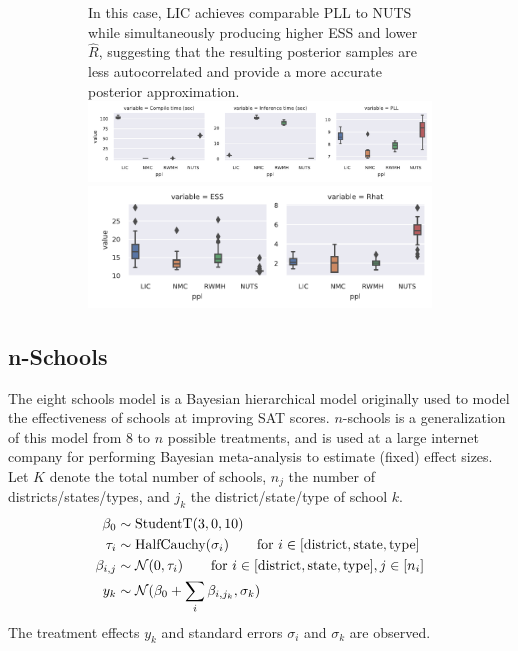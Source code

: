 \documentclass[thesis.tex]{subfiles}
\begin{document}
\begin{figure}
\begin{subfigure}[b]{\textwidth}
{      In this case, LIC achieves comparable PLL to NUTS while simultaneously producing
      higher ESS and lower $\widehat{R}$, suggesting that the resulting posterior samples
      are less autocorrelated and provide a more accurate posterior approximation.
    }\label{fig:nschools}
    \includegraphics[width=\linewidth]{Figures/nschools_pll_type1.pdf}
    \includegraphics[width=0.66\linewidth]{Figures/nschools_ess_rhat_type1.pdf}
  \end{subfigure}
\end{figure}


\subsection{n-Schools}
\label{ssec:nschools}

The eight schools model \citep{rubin1981estimation} is a Bayesian
hierarchical model originally used to model the effectiveness of schools at
improving SAT scores. $n$-schools is a generalization of this model from $8$
to $n$ possible treatments, and is used at a large internet company for
performing Bayesian meta-analysis \cite{sutton2001bayesian} to estimate
(fixed) effect sizes.
Let $K$ denote the total number of schools, $n_j$ the number of
districts/states/types, and $j_k$ the district/state/type of school $k$.
\begin{align*}
  \beta_0     & \sim \text{StudentT}(3, 0, 10)                                                                         \\
  \tau_{i}    & \sim \text{HalfCauchy}(\sigma_i) \qquad \text{for}~i \in [\text{district}, \text{state}, \text{type}]  \\
  \beta_{i,j} & \sim \mathcal{N}(0, \tau_i)  \qquad \text{for}~i \in [\text{district}, \text{state}, \text{type}], j \in [n_i] \\
  y_k         & \sim \mathcal{N}(\beta_0 + \sum_i \beta_{i,j_k}, \sigma_k)
\end{align*}
The treatment effects $y_k$ and standard errors $\sigma_i$ and $\sigma_k$ are observed.
\end{document}
